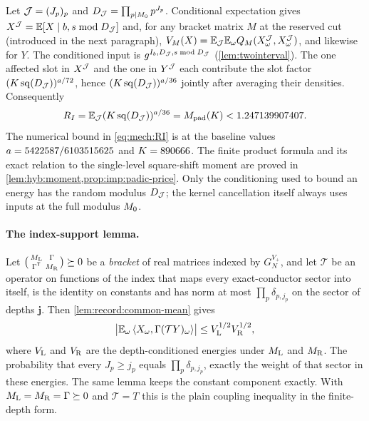 Let $\mathcal J=(J_p)_p$ and $D_\mathcal J=\prod_{p\mid M_0}p^{J_p}$. Conditional
expectation gives $X^\mathcal J=\mathbb E[X\mid b,s\bmod D_\mathcal J]$ and,
for any bracket matrix $M$ at the reserved cut (introduced
in the next paragraph),
$V_M(X)=\mathbb E_\mathcal J\mathbb E_\omega Q_M(X^\mathcal J_\omega,X^\mathcal J_\omega)$, and
likewise for $Y$.
The conditioned input is $g^{I_b,D_\mathcal J,s\bmod D_\mathcal J}$
(\cref{lem:twointerval}). The one affected slot in $X^\mathcal J$ and the one in
$Y^\mathcal J$ each contribute the slot factor
$(K\operatorname{sq}(D_\mathcal J))^{a/72}$, hence $(K\operatorname{sq}(D_\mathcal J))^{a/36}$
jointly after averaging their densities. Consequently
\begin{equation}\label{eq:mech:RI}
 R_I=\mathbb E_\mathcal J(K\operatorname{sq}(D_\mathcal J))^{a/36}
 =M_{\rm pad}(K)<1.247139907407.
\end{equation}
The numerical bound in \eqref{eq:mech:RI} is at the baseline
values $a=5422587/6103515625$ and $K=890666$. The finite product formula
and its exact relation to the single-level square-shift moment are
proved in \cref{lem:hyb:moment,prop:imp:padic-price}.
Only the conditioning used to bound an energy has the random modulus
$D_\mathcal J$; the kernel cancellation itself always uses inputs at the
full modulus $M_0$.

\paragraph{The index-support lemma.}
Let $\bigl(\begin{smallmatrix}M_{\rm L}&\Gamma\\ \Gamma^{\mathsf T}&M_{\rm R}
\end{smallmatrix}\bigr)\succeq0$ be a \emph{bracket} of real matrices indexed by
$G_N^{V_+}$, and let $\mathcal T$ be an operator on functions of the index that
maps every exact-conductor sector into itself, is the identity on constants
and has norm at most $\prod_p\delta_{p,j_p}$ on the sector of depths
$\mathbf j$. Then \cref{lem:record:common-mean} gives
\begin{equation}\label{eq:mech:index-support}
 \bigl|\mathbb E_\omega\left\langle X_\omega,\Gamma(\mathcal TY)_\omega\right\rangle\bigr|
 \le V_{\rm L}^{1/2}V_{\rm R}^{1/2},
\end{equation}
where $V_{\rm L}$ and $V_{\rm R}$ are the depth-conditioned energies under
$M_{\rm L}$ and $M_{\rm R}$. The probability that every $J_p\ge j_p$ equals
$\prod_p\delta_{p,j_p}$, exactly the weight of that sector in these energies.
The same lemma keeps the constant component exactly. With
$M_{\rm L}=M_{\rm R}=\Gamma\succeq0$ and $\mathcal T=T$ this is the plain
coupling inequality in the finite-depth form.

